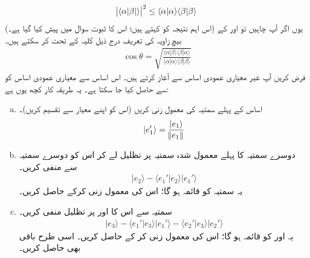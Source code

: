 
\begin{align}\label{ضمیمہ_اندرونی_ضرب_شوارز_عدم_مساوات}
\abs{\langle\alpha|\beta|\rangle}^2\le \langle \alpha |\alpha \rangle \langle\beta|\beta\rangle
\end{align}
(اس  اہم نتیجہ کو  کہتے ہیں؛ اس کا ثبوت سوال  میں پیش کیا گیا ہے۔) یوں اگر آپ چاہیں تو  اور  کے بیچ زاویہ  کی تعریف درج ذیل کلیہ کے تحت کر سکتے ہیں۔
\begin{align}
\cos\theta=\sqrt{\frac{\langle\alpha|\beta\rangle\langle\beta|\alpha\rangle}{\langle\alpha|\alpha\rangle\langle\beta|\beta\rangle}}
\end{align} 
فرض کریں آپ غیر معیاری عمودی اساس   سے آغاز  کرتے  ہیں۔ اس اساس سے معیاری
 عمودی اساس     کو   سے حاصل کیا جا سکتا ہے۔ یہ طریقہ کار کچھ یوں ہے:
 \begin{enumerate}[a.]
 \item
 اساس  کے پہلے  سمتیہ کی  معمول زنی کریں  (اس کو اپنے معیار سے تقسیم کریں)۔
 \begin{align*}
 |e_1'\rangle=\frac{|e_1\rangle}{\norm{e_1}}
 \end{align*}
 \item
 دوسرے سمتیہ کا پہلے    معمول شدہ سمتیہ پر تظلیل  لے کر اس کو دوسرے سمتیہ سے منفی کریں۔
 \begin{align*}
 |e_2\rangle-\langle e_1'|e_2\rangle|e_1'\rangle
 \end{align*}
 یہ سمتیہ  کو  قائمہ  ہو گا؛ اس کی  معمول زنی کرکے    حاصل کریں۔
 \item
 سمتیہ  سے اس کا    اور  پر تظلیل منفی کریں۔
 \begin{align*}
 |e_3\rangle-\langle e_1'|e_3\rangle|e_1'\rangle-\langle e_2'|e_3\rangle|e_2'\rangle
 \end{align*}
 یہ  اور  کو قائمہ  ہو گا؛ اس کی معمول زنی کر کے    حاصل کریں۔ اسی طرح باقی بھی حاصل کریں۔
  \end{enumerate}
